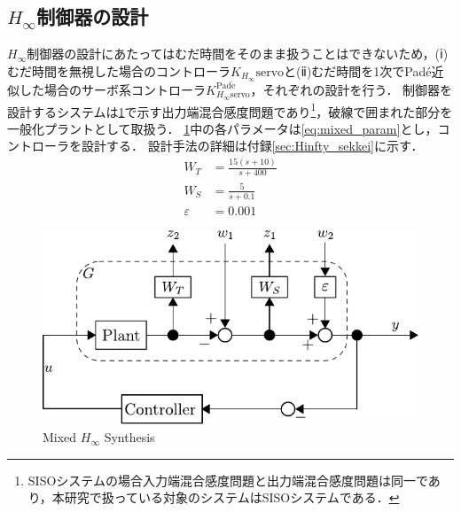 \clearpage
\subsection{$H_\infty$制御器の設計}
\label{sec:H無限大制御器の設計}
$H_\infty$制御器の設計にあたってはむだ時間をそのまま扱うことはできないため，(ⅰ)むだ時間を無視した場合のコントローラ$K_{H_\infty}\mathrm{servo}$と(ⅱ)むだ時間を1次でPad\'e近似した場合のサーボ系コントローラ$K_{H_\infty\mathrm{servo}}^{\mathrm{Pad\acute{e}}}$，それぞれの設計を行う．
制御器を設計するシステムは\figname\ref{fig4:konngoukanndo}で示す出力端混合感度問題であり\footnote{SISOシステムの場合入力端混合感度問題と出力端混合感度問題は同一であり，本研究で扱っている対象のシステムはSISOシステムである．}，破線で囲まれた部分を一般化プラントとして取扱う．
\figname\ref{fig4:konngoukanndo}中の各パラメータは\eqnname\ref{eq:mixed_param}とし，コントローラを設計する．
設計手法の詳細は付録\ref{sec:Hinfty_sekkei}に示す．
\begin{align}
    \label{eq:mixed_param}
		W_T &= \frac{15(s+10)}{s+400}\\
		W_S &= \frac{5}{s+0.1}\\
		\varepsilon &= 0.001
\end{align}
\begin{figure}[t]
    \centering
        \includegraphics[keepaspectratio, scale=1.0]{contents/ForceControl/figure/konngoukanndo.pdf}
        \caption{Mixed $H_\infty$ Synthesis}
        \label{fig4:konngoukanndo}
\end{figure}


